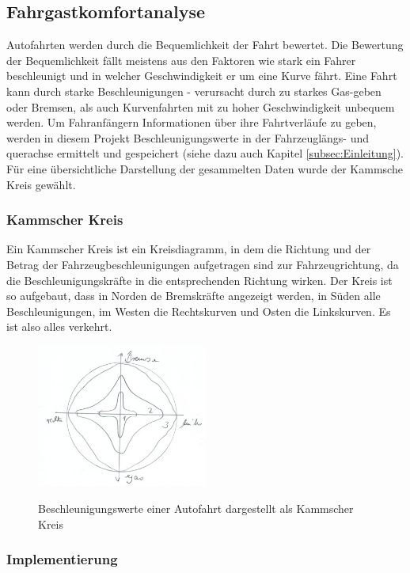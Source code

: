 \subsection{Fahrgastkomfortanalyse}
\label{subsec:fahrgastkomfortanalyse}

Autofahrten werden durch die Bequemlichkeit der Fahrt bewertet. 
Die Bewertung der Bequemlichkeit fällt meistens aus den Faktoren wie stark ein Fahrer beschleunigt und in welcher Geschwindigkeit er um eine Kurve fährt. Eine Fahrt kann durch starke Beschleunigungen - verursacht durch zu  starkes Gas-geben oder Bremsen, als auch Kurvenfahrten mit zu hoher Geschwindigkeit unbequem werden. Um Fahranfängern Informationen über ihre Fahrtverläufe zu geben, werden in diesem Projekt Beschleunigungswerte in der Fahrzeuglängs- und querachse ermittelt und gespeichert (siehe dazu auch Kapitel \ref{subsec:Einleitung}). Für eine übersichtliche Darstellung der gesammelten Daten wurde der Kammsche Kreis gewählt.

\subsubsection{Kammscher Kreis }
Ein Kammscher Kreis ist ein Kreisdiagramm, in dem die Richtung und der Betrag der Fahrzeugbeschleunigungen aufgetragen sind zur Fahrzeugrichtung, da die Beschleunigungskräfte in die entsprechenden Richtung wirken.
Der Kreis ist so aufgebaut, dass in Norden de Bremskräfte angezeigt werden, in Süden alle Beschleunigungen, im Westen die Rechtskurven und Osten die Linkskurven.
Es ist also alles verkehrt.
\begin{figure}[!htb]\centering
	\includegraphics[width=0.5\textwidth]{images/kammsherkreis}
	\caption{Beschleunigungswerte einer Autofahrt dargestellt als Kammscher Kreis} \cite{FAIF.CH3-fahrkomfortanalyse.KammscherKreis}\label{Fig:Kammsher-Kreis}
\end{figure}

\subsubsection{Implementierung}

